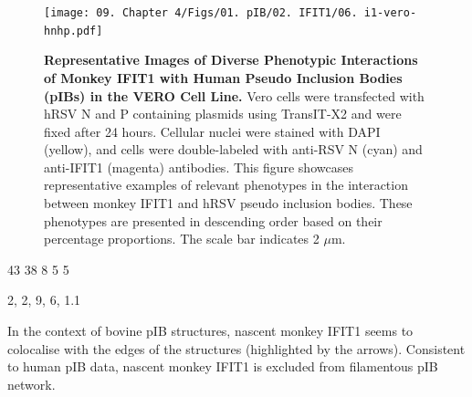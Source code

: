 \begin{figure}
    \centering
    \texttt{[image: 09. Chapter 4/Figs/01. pIB/02. IFIT1/06. i1-vero-hnhp.pdf]}
    \caption[Representative Images of Diverse Phenotypic Interactions of Monkey IFIT1 with Human Pseudo Inclusion Bodies (pIBs) in the VERO Cell Line.]{\textbf{Representative Images of Diverse Phenotypic Interactions of Monkey IFIT1 with Human Pseudo Inclusion Bodies (pIBs) in the VERO Cell Line.} Vero cells were transfected with hRSV N and P containing plasmids using TransIT-X2 and were fixed after 24 hours. Cellular nuclei were stained with DAPI (yellow), and cells were double-labeled with anti-RSV N (cyan) and anti-IFIT1 (magenta) antibodies. This figure showcases representative examples of relevant phenotypes in the interaction between monkey IFIT1 and hRSV pseudo inclusion bodies. These phenotypes are presented in descending order based on their percentage proportions. The scale bar indicates 2 \(\mu \mbox{m}\).}
    \label{fig:Representative Images of Diverse Phenotypic Interactions of Monkey IFIT1 with Human Pseudo Inclusion Bodies (pIBs) in the VERO Cell Line}
\end{figure}

43 38 8 5 5

2, 2, 9, 6, 1.1

In the context of bovine pIB structures, nascent monkey IFIT1 seems to colocalise with the edges of the structures (highlighted by the arrows). Consistent to human pIB data, nascent monkey IFIT1 is excluded from filamentous pIB network.

